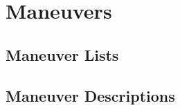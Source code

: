 \chapter{Maneuvers}\label{Maneuvers}

\section{Maneuver Lists}\label{Maneuver Lists}

    

\section{Maneuver Descriptions}\label{Maneuver Descriptions}

    
